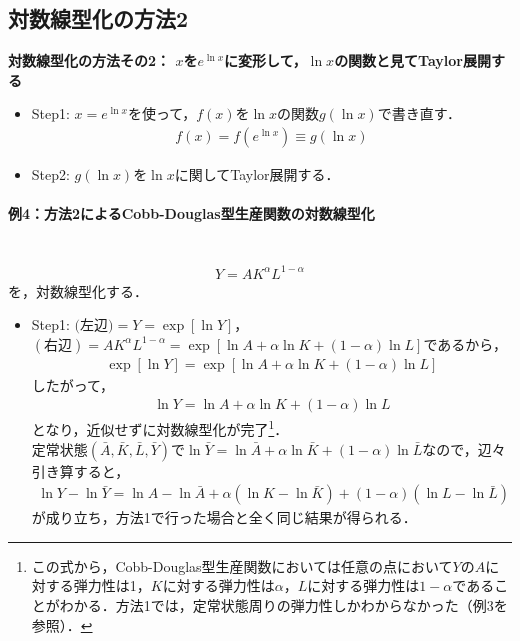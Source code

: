 \documentclass[a4paper,12pt,onecolumn,oneside,notitlepage,final]{article}
\begin{document}
\subsection{対数線型化の方法2}
\begin{itembox}[l]{{\bf 対数線型化の方法その2： $x$を$e^{\ln x}$に変形して，$\ln x$の関数と見てTaylor展開する}}
\begin{itemize}
\item Step1: $x = e^{\ln x}$を使って，$f(x)$を$\ln x$の関数$g(\ln x)$で書き直す．
\begin{align*}
f(x) = f(e^{\ln x}) \equiv g(\ln x)
\end{align*}
\item Step2: $g(\ln x)$を$\ln x$に関してTaylor展開する．
\end{itemize}
\end{itembox}

\paragraph{例4：方法2によるCobb-Douglas型生産関数の対数線型化}~\\
\begin{align*}
Y = AK^\alpha L^{1-\alpha}
\end{align*}
を，対数線型化する．
\begin{itemize}
\item Step1: $\text{(左辺)} = Y = \exp[\ln Y]$，$(\text{右辺}) = AK^\alpha L^{1-\alpha} = \exp[\ln A + \alpha \ln K + (1-\alpha)\ln L]$であるから，
\begin{align*}
\exp[\ln Y] = \exp[\ln A + \alpha \ln K + (1-\alpha) \ln L]
\end{align*}
したがって，
\begin{align*}
\ln Y = \ln A + \alpha \ln K + (1-\alpha) \ln L
\end{align*}
となり，近似せずに対数線型化が完了\footnote{この式から，Cobb-Douglas型生産関数においては任意の点において$Y$の$A$に対する弾力性は1，$K$に対する弾力性は$\alpha$，$L$に対する弾力性は$1-\alpha$であることがわかる．方法1では，定常状態周りの弾力性しかわからなかった（例3を参照）．}．\\
定常状態$(\bar A, \bar K, \bar L, \bar Y)$で$\ln \bar Y = \ln \bar A + \alpha \ln \bar K + (1-\alpha) \ln \bar L$なので，辺々引き算すると，
\begin{align*}
\ln Y - \ln \bar Y = \ln A - \ln \bar A + \alpha (\ln K - \ln \bar K) + (1-\alpha) (\ln L - \ln \bar L)
\end{align*}
が成り立ち，方法1で行った場合と全く同じ結果が得られる．
\end{itemize}
\end{document}
